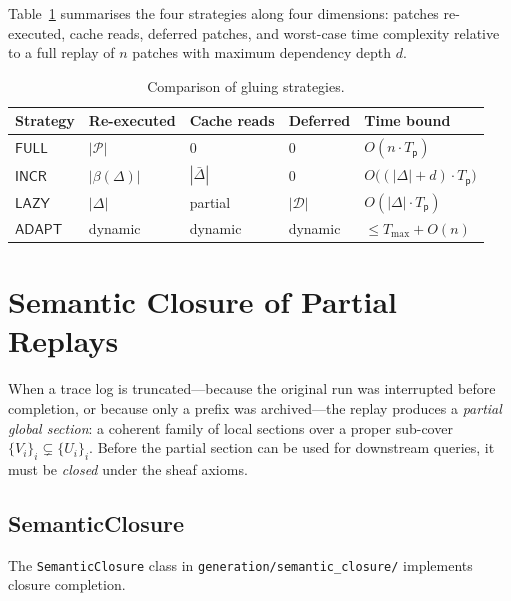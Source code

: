 \documentclass[11pt]{article}
\newcommand{\Patch}{\mathsf{p}}
\newcommand{\PatchSet}{\mathcal{P}}
\newcommand{\ChangedSet}{\Delta}
\newcommand{\UnchangedSet}{\bar\Delta}
\newcommand{\BlastRadius}{\beta}
\newcommand{\StratFull}{\mathsf{FULL}}
\newcommand{\StratInc}{\mathsf{INCR}}
\newcommand{\StratLazy}{\mathsf{LAZY}}
\newcommand{\StratAdapt}{\mathsf{ADAPT}}
\begin{document}
Table~\ref{tab:strategies} summarises the four strategies along four
dimensions: patches re-executed, cache reads, deferred patches, and
worst-case time complexity relative to a full replay of $n$ patches with
maximum dependency depth $d$.

\begin{table}[htbp]
\centering
\caption{Comparison of gluing strategies.}
\label{tab:strategies}
\begin{tabularx}{\textwidth}{lXXXX}
\toprule
Strategy & Re-executed & Cache reads & Deferred & Time bound \\
\midrule
$\StratFull$  & $|\PatchSet|$ & 0 & 0 & $O(n \cdot T_{\Patch})$ \\
$\StratInc$   & $|\BlastRadius(\ChangedSet)|$ & $|\UnchangedSet|$ & 0
  & $O\bigl((|\ChangedSet|+d)\cdot T_\Patch\bigr)$ \\
$\StratLazy$  & $|\ChangedSet|$ & partial & $|\mathcal{D}|$
  & $O(|\ChangedSet|\cdot T_\Patch)$ \\
$\StratAdapt$ & dynamic & dynamic & dynamic & $\leq T_{\max} + O(n)$ \\
\bottomrule
\end{tabularx}
\end{table}


\section{Semantic Closure of Partial Replays}
\label{sec:closure}

When a trace log is truncated—because the original run was
interrupted before completion, or because only a prefix was
archived—the replay produces a \emph{partial global section}: a coherent
family of local sections over a proper sub-cover
$\{V_i\}_i \subsetneq \{U_i\}_i$.  Before the partial section can be
used for downstream queries, it must be \emph{closed} under the
sheaf axioms.

\subsection{SemanticClosure}

The \texttt{SemanticClosure} class in
\texttt{generation/semantic\_closure/} implements closure completion.
\end{document}
